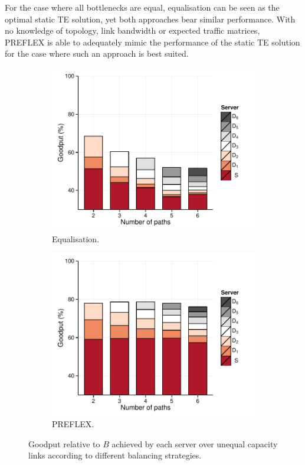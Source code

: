 For the case where all bottlenecks are equal, equalisation can be seen as the optimal static TE solution, yet both approaches bear similar performance. 
With no knowledge of topology, link bandwidth or expected traffic matrices, \ac{PREFLEX} is able to adequately mimic the performance of the static TE solution for the case where such an approach is best suited.

\begin{figure}
    \centering
    \begin{subfigure}[b]{.5\linewidth}
        \centering
        \includegraphics[width=0.95\linewidth]{figures/cate/equal-diff}
        \caption{\label{eqdiff}Equalisation.}
    \end{subfigure}%
    \begin{subfigure}[b]{.5\linewidth}
        \centering
        \includegraphics[width=0.95\linewidth]{figures/cate/preflex-diff}
        \caption{\label{preflexdiff}PREFLEX.}
    \end{subfigure}
    \caption[Goodput achieved over unequal capacity links.]{Goodput relative to $B$ achieved by each server over unequal capacity links according to different balancing strategies.\label{fig:goodputdiff}}
\end{figure}

